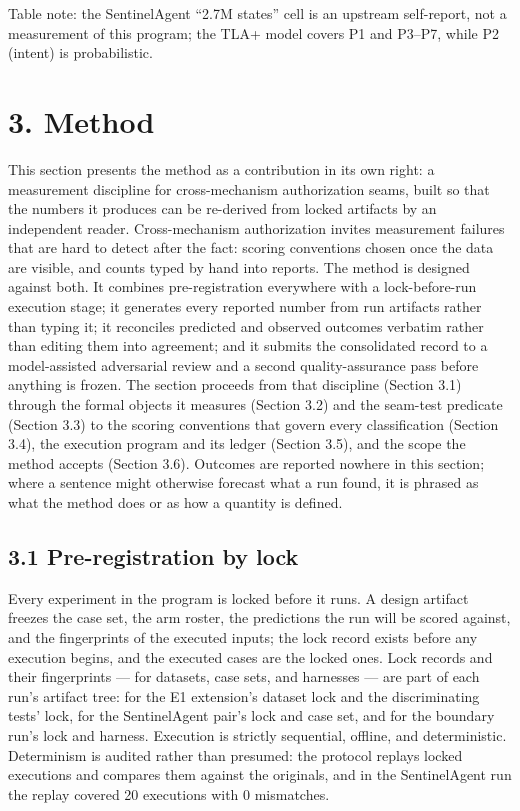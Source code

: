 \documentclass[
  10pt,
]{article}
\renewcommand{\_}{\origunderscore\allowbreak}
\begin{document}
Table note: the SentinelAgent ``2.7M states'' cell is an upstream
self-report, not a measurement of this program; the TLA+ model covers P1
and P3--P7, while P2 (intent) is probabilistic.

\section{3. Method}\label{method}

This section presents the method as a contribution in its own right: a
measurement discipline for cross-mechanism authorization seams, built so
that the numbers it produces can be re-derived from locked artifacts by
an independent reader. Cross-mechanism authorization invites measurement
failures that are hard to detect after the fact: scoring conventions
chosen once the data are visible, and counts typed by hand into reports.
The method is designed against both. It combines pre-registration
everywhere with a lock-before-run execution stage; it generates every
reported number from run artifacts rather than typing it; it reconciles
predicted and observed outcomes verbatim rather than editing them into
agreement; and it submits the consolidated record to a model-assisted
adversarial review and a second quality-assurance pass before anything
is frozen. The section proceeds from that discipline (Section 3.1)
through the formal objects it measures (Section 3.2) and the seam-test
predicate (Section 3.3) to the scoring conventions that govern every
classification (Section 3.4), the execution program and its ledger
(Section 3.5), and the scope the method accepts (Section 3.6). Outcomes
are reported nowhere in this section; where a sentence might otherwise
forecast what a run found, it is phrased as what the method does or as
how a quantity is defined.

\subsection{3.1 Pre-registration by
lock}\label{pre-registration-by-lock}

Every experiment in the program is locked before it runs. A design
artifact freezes the case set, the arm roster, the predictions the run
will be scored against, and the fingerprints of the executed inputs; the
lock record exists before any execution begins, and the executed cases
are the locked ones. Lock records and their fingerprints --- for
datasets, case sets, and harnesses --- are part of each run's artifact
tree: for the E1 extension's dataset lock and the discriminating tests'
lock, for the SentinelAgent pair's lock and case set, and for the
boundary run's lock and harness. Execution is strictly sequential,
offline, and deterministic. Determinism is audited rather than presumed:
the protocol replays locked executions and compares them against the
originals, and in the SentinelAgent run the replay covered 20 executions
with 0 mismatches.
\end{document}
